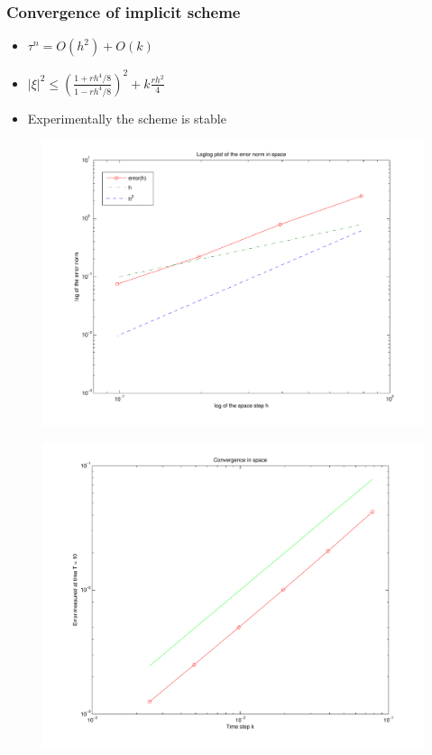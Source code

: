 \documentclass[screen]{beamer}
\begin{document}
\begin{frame}
\frametitle{Convergence of implicit scheme}

\begin{itemize}
\item $\tau ^n = O(h^2) + O(k) $
\item $|\xi |^2 \le \left(\frac{1+rh^4/8}{1-rh^4/8}\right)^2 + k\frac{rh^2}{4}$
\item Experimentally the scheme is stable
\end{itemize}

\end{frame}

\begin{frame}

\begin{figure}[htb]
\includegraphics[width=1\textwidth]{conv_space_IMEX_T50.pdf}
\end{figure}

\end{frame}

\begin{frame}

\begin{figure}[htb]
\includegraphics[width=1\textwidth]{conv_time_IMEXT10.pdf}
\end{figure}

\end{frame}
\end{document}
